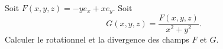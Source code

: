 
\begin{exercice}\label{exoOutilsMath-0065}

    Soit $F(x,y,z)=-ye_x+x e_y$. Soit
    \begin{equation}
        G(x,y,z)=\frac{ F(x,y,z) }{ x^2+y^2 }.
    \end{equation}
    Calculer le rotationnel et la divergence des champs $F$ et $G$.

\end{exercice}

